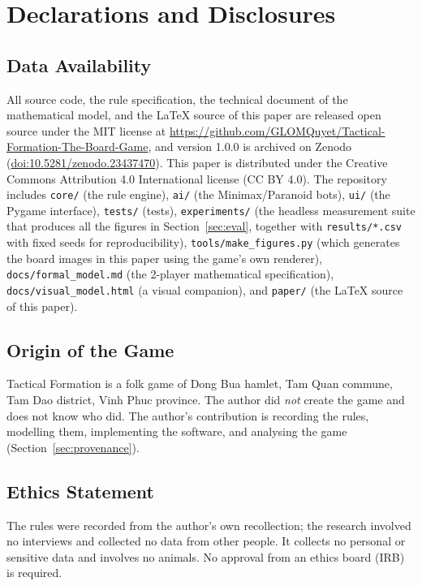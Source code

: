 \section*{Declarations and Disclosures}
\label{sec:disclosures}

\subsection*{Data Availability}

All source code, the rule specification, the technical document of the
mathematical model, and the LaTeX source of this paper are released open
source under the MIT license at
\url{https://github.com/GLOMQuyet/Tactical-Formation-The-Board-Game}, and
version 1.0.0 is archived on Zenodo
(\href{https://doi.org/10.5281/zenodo.23437470}{doi:10.5281/zenodo.23437470}). This paper is distributed under the
Creative Commons Attribution 4.0 International license (CC BY 4.0). The
repository includes \texttt{core/} (the rule engine), \texttt{ai/} (the
Minimax/Paranoid bots), \texttt{ui/} (the Pygame interface),
\texttt{tests/} (tests), \texttt{experiments/} (the headless measurement
suite that produces all the figures in Section~\ref{sec:eval}, together with
\texttt{results/*.csv} with fixed seeds for reproducibility),
\texttt{tools/make\_figures.py} (which generates the board images in this
paper using the game's own renderer), \texttt{docs/formal\_model.md} (the
2-player mathematical specification), \texttt{docs/visual\_model.html} (a
visual companion), and \texttt{paper/} (the LaTeX source of this paper).

\subsection*{Origin of the Game}

Tactical Formation is a folk game of Dong Bua hamlet, Tam Quan commune, Tam Dao
district, Vinh Phuc province. The author did \emph{not} create the game and
does not know who did. The author's contribution is recording the rules,
modelling them, implementing the software, and analysing the game
(Section~\ref{sec:provenance}).

\subsection*{Ethics Statement}

The rules were recorded from the author's own recollection; the research
involved no interviews and collected no data from other people. It collects
no personal or sensitive data and involves no animals. No approval from an
ethics board (IRB) is required.

